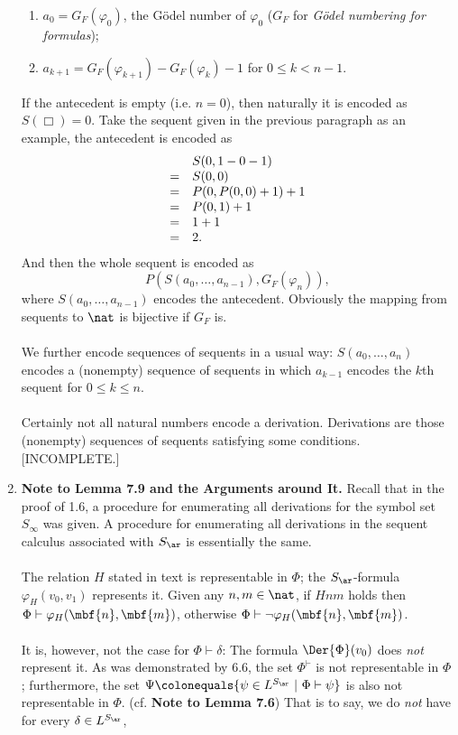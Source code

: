 \begin{enumerate}[1.]
\begin{enumerate}[(1)]
\item $a_0 = G_F(\varphi_0)$, the G\"{o}del number of $\varphi_0$ ($G_F$ for \emph{G\"{o}del numbering for formulas});
\item $a_{k + 1} = G_F(\varphi_{k + 1}) - G_F(\varphi_k) - 1$ for $0 \leq k < n - 1$.
\end{enumerate}
If the antecedent is empty (i.e. $n = 0$), then naturally it is encoded as $S(\Box) = 0$. Take the sequent given in the previous paragraph as an example, the antecedent is encoded as
\[
\begin{array}{ll}
\ & S(0, 1 - 0 - 1) \cr
= & S(0, 0) \cr
= & P(0, P(0, 0) + 1) + 1 \cr
= & P(0, 1) + 1 \cr
= & 1 + 1 \cr
= & 2.
\end{array}
\]
And then the whole sequent is encoded as
\[
P(S(a_0, \ldots, a_{n - 1}), G_F(\varphi_n)),
\]
where $S(a_0, \ldots, a_{n - 1})$ encodes the antecedent. Obviously the mapping from sequents to $\nat$ is bijective if $G_F$ is.\\
\ \\
We further encode sequences of sequents in a usual way: $S(a_0, \ldots, a_n)$ encodes a (nonempty) sequence of sequents in which $a_{k - 1}$ encodes the $k$th sequent for $0 \leq k \leq n$.\\
\ \\
Certainly not all natural numbers encode a derivation. Derivations are those (nonempty) sequences of sequents satisfying some conditions. [INCOMPLETE.]
%
\item \textbf{Note to Lemma 7.9 and the Arguments around It.} Recall that in the proof of 1.6, a procedure for enumerating all derivations for the symbol set $S_\infty$ was given. A procedure for enumerating all derivations in the sequent calculus associated with $S_\ar$ is essentially the same.\\
\ \\
The relation $H$ stated in text is representable in $\Phi$; the $S_\ar$-formula $\varphi_H (v_0, v_1)$ represents it. Given any $n, m \in \nat$, if $H n m$ holds then $\Phi \vdash \varphi_H (\mbf{n}, \mbf{m})$, otherwise $\Phi \vdash \neg\varphi_H (\mbf{n}, \mbf{m})$.\\
\ \\
It is, however, not the case for $\Phi \vdash \delta$: The formula $\Der{\Phi}(v_0)$ does \emph{not} represent it. As was demonstrated by 6.6, the set $\Phi^\vdash$ is not representable in $\Phi$; furthermore, the set $\Psi \colonequals \{ \psi \in L^{S_\ar} \ | \ \Phi \vdash \psi \}$ is also not representable in $\Phi$. (cf. \textbf{Note to Lemma 7.6}) That is to say, we do \emph{not} have for every $\delta \in L^{S_\ar}$,

\end{enumerate}
